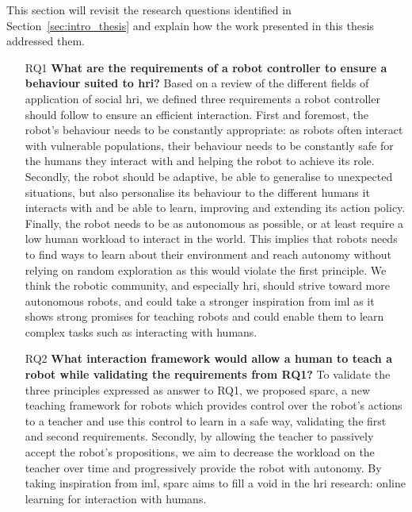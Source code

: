 This section will revisit the research questions identified in Section~\ref{sec:intro_thesis} and explain how the work presented in this thesis addressed them.
\begin{itemize}
	\item [RQ1] \textbf{What are the requirements of a robot controller to ensure a behaviour suited to \gls{hri}?} 
	Based on a review of the different fields of application of social \gls{hri}, we defined three requirements a robot controller should follow to ensure an efficient interaction. First and foremost, the robot's behaviour needs to be constantly appropriate: as robots often interact with vulnerable populations, their behaviour needs to be constantly safe for the humans they interact with and helping the robot to achieve its role. Secondly, the robot should be adaptive, be able to generalise to unexpected situations, but also personalise its behaviour to the different humans it interacts with and be able to learn, improving and extending its action policy. Finally, the robot needs to be as autonomous as possible, or at least require a low human workload to interact in the world. This implies that robots needs to find ways to learn about their environment and reach autonomy without relying on random exploration as this would violate the first principle. We think the robotic community, and especially \gls{hri}, should strive toward more autonomous robots, and could take a stronger inspiration from \gls{iml} as it shows strong promises for teaching robots and could enable them to learn complex tasks such as interacting with humans.
	
	\item [RQ2] \textbf{What interaction framework would allow a human to teach a robot while validating the requirements from RQ1?}
	To validate the three principles expressed as answer to RQ1, we proposed \gls{sparc}, a new teaching framework for robots which provides control over the robot's actions to a teacher and use this control to learn in a safe way, validating the first and second requirements. Secondly, by allowing the teacher to passively accept the robot's propositions, we aim to decrease the workload on the teacher over time and progressively provide the robot with autonomy. By taking inspiration from \gls{iml}, \gls{sparc} aims to fill a void in the \gls{hri} research: online learning for interaction with humans.
	

\end{itemize}
